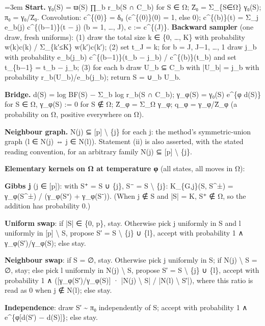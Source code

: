 \documentclass[11pt]{report}
\newenvironment{mdblock}{\begingroup\mdfont\raggedright\setlength{\parindent}{0pt}\setlength{\parskip}{0.55em}\emergencystretch=3em}{\par\endgroup}
\begin{document}
\begin{mdblock}
\textbf{Start.} γ₀(S) = ϖ(S) ∏\_b r\_b(S ∩ C\_b) for S ∈ Ω; Z̄₀ = Σ\_\{S∈Ω\} γ₀(S); π₀ = γ₀/Z̄₀. Convolution: c\textasciicircum{}\{(0)\} = δ₀ (c\textasciicircum{}\{(0)\}(0) = 1, else 0); c\textasciicircum{}\{(b)\}(t) = Σ\_j e\_b(j) c\textasciicircum{}\{(b−1)\}(t − j) (b = 1, …, J), c := c\textasciicircum{}\{(J)\}. \textbf{Backward sampler} (one draw, fresh uniforms): (1) draw the total size k ∈ \{0, …, K\} with probability w(k)c(k) / Σ\_\{k′≤K\} w(k′)c(k′); (2) set t\_J = k; for b = J, J−1, …, 1 draw j\_b with probability e\_b(j\_b) c\textasciicircum{}\{(b−1)\}(t\_b − j\_b) / c\textasciicircum{}\{(b)\}(t\_b) and set t\_\{b−1\} = t\_b − j\_b; (3) for each b draw U\_b ⊆ C\_b with |U\_b| = j\_b with probability r\_b(U\_b)/e\_b(j\_b); return S = ∪\_b U\_b.

\textbf{Bridge.} d(S) = log BF(S) − Σ\_b log r\_b(S ∩ C\_b); γ\_φ(S) = γ₀(S) e\textasciicircum{}\{φ d(S)\} for S ∈ Ω, γ\_φ(S) := 0 for S ∉ Ω; Z̄\_φ = Σ\_Ω γ\_φ; q\_φ = γ\_φ/Z̄\_φ (a probability on Ω, positive everywhere on Ω).

\textbf{Neighbour graph.} N(j) ⊆ [p] \textbackslash{} \{j\} for each j: the method's symmetric-union graph (l ∈ N(j) ⇔ j ∈ N(l)). Statement (ii) is also asserted, with the stated reading convention, for an arbitrary family N(j) ⊆ [p] \textbackslash{} \{j\}.

\textbf{Elementary kernels on Ω at temperature φ} (all states, all moves in Ω):

\begin{mdbul}
\item \textbf{Gibbs j} (j ∈ [p]): with S⁺ = S ∪ \{j\}, S⁻ = S \textbackslash{} \{j\}: K\_\{G,j\}(S, S\textasciicircum{}±) = γ\_φ(S\textasciicircum{}±) / (γ\_φ(S⁺) + γ\_φ(S⁻)). (When j ∉ S and |S| = K, S⁺ ∉ Ω, so the addition has probability 0.)
\item \textbf{Uniform swap}: if |S| ∈ \{0, p\}, stay. Otherwise pick j uniformly in S and l uniformly in [p] \textbackslash{} S, propose S′ = S \textbackslash{} \{j\} ∪ \{l\}, accept with probability 1 ∧ γ\_φ(S′)/γ\_φ(S); else stay.
\item \textbf{Neighbour swap}: if S = ∅, stay. Otherwise pick j uniformly in S; if N(j) \textbackslash{} S = ∅, stay; else pick l uniformly in N(j) \textbackslash{} S, propose S′ = S \textbackslash{} \{j\} ∪ \{l\}, accept with probability 1 ∧ ([γ\_φ(S′)/γ\_φ(S)] · |N(j) \textbackslash{} S| / |N(l) \textbackslash{} S′|), where this ratio is read as 0 when j ∉ N(l); else stay.
\item \textbf{Independence}: draw S′ \textasciitilde{} π₀ independently of S; accept with probability 1 ∧ e\textasciicircum{}\{φ[d(S′) − d(S)]\}; else stay.
\end{mdbul}


\end{mdblock}
\end{document}
